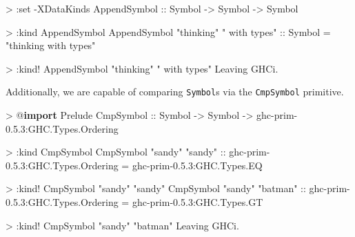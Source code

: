 \documentclass[
  11pt,
]{book}
\newenvironment{Shaded}{}{}
\newcommand{\CharTok}[1]{\textcolor[rgb]{0.25,0.44,0.63}{#1}}
\newcommand{\DataTypeTok}[1]{\textcolor[rgb]{0.56,0.13,0.00}{#1}}
\newcommand{\DecValTok}[1]{\textcolor[rgb]{0.25,0.63,0.44}{#1}}
\newcommand{\FloatTok}[1]{\textcolor[rgb]{0.25,0.63,0.44}{#1}}
\newcommand{\KeywordTok}[1]{\textcolor[rgb]{0.00,0.44,0.13}{\textbf{#1}}}
\newcommand{\NormalTok}[1]{#1}
\newcommand{\OperatorTok}[1]{\textcolor[rgb]{0.40,0.40,0.40}{#1}}
\newcommand{\OtherTok}[1]{\textcolor[rgb]{0.00,0.44,0.13}{#1}}
\newcommand{\StringTok}[1]{\textcolor[rgb]{0.25,0.44,0.63}{#1}}
\theoremstyle{nonumberplain}
\begin{document}
\begin{Shaded}
\begin{Highlighting}[]
\OperatorTok{\textgreater{}} \OperatorTok{:}\NormalTok{set }\OperatorTok{{-}}\DataTypeTok{XDataKinds}
\DataTypeTok{AppendSymbol}\OtherTok{ ::} \DataTypeTok{Symbol} \OtherTok{{-}\textgreater{}} \DataTypeTok{Symbol} \OtherTok{{-}\textgreater{}} \DataTypeTok{Symbol}


\OperatorTok{\textgreater{}} \OperatorTok{:}\NormalTok{kind }\DataTypeTok{AppendSymbol}
\DataTypeTok{AppendSymbol} \StringTok{"thinking"} \StringTok{" with types"}\OtherTok{ ::} \DataTypeTok{Symbol}
\OtherTok{=} \StringTok{"thinking with types"}


\OperatorTok{\textgreater{}} \OperatorTok{:}\NormalTok{kind}\OperatorTok{!} \DataTypeTok{AppendSymbol} \StringTok{"thinking"} \StringTok{" with types"}
\DataTypeTok{Leaving} \DataTypeTok{GHCi}\OperatorTok{.}
\end{Highlighting}
\end{Shaded}

Additionally, we are capable of comparing \texttt{Symbol}s via the
\texttt{CmpSymbol} primitive.

\begin{Shaded}
\begin{Highlighting}[]
\OperatorTok{\textgreater{}} \OperatorTok{@}\KeywordTok{import} \DataTypeTok{Prelude}
\DataTypeTok{CmpSymbol}\OtherTok{ ::} \DataTypeTok{Symbol} \OtherTok{{-}\textgreater{}} \DataTypeTok{Symbol} \OtherTok{{-}\textgreater{}}\NormalTok{ ghc}\OperatorTok{{-}}\NormalTok{prim}\OperatorTok{{-}}\FloatTok{0.5}\OperatorTok{.}\DecValTok{3}\OperatorTok{:}\DataTypeTok{GHC.Types.Ordering}


\OperatorTok{\textgreater{}} \OperatorTok{:}\NormalTok{kind }\DataTypeTok{CmpSymbol}
\DataTypeTok{CmpSymbol} \StringTok{"sandy"} \StringTok{"sandy"}\OtherTok{ ::}\NormalTok{ ghc}\OperatorTok{{-}}\NormalTok{prim}\OperatorTok{{-}}\FloatTok{0.5}\OperatorTok{.}\DecValTok{3}\OperatorTok{:}\DataTypeTok{GHC.Types.Ordering}
\OtherTok{=} \CharTok{\textquotesingle{}ghc{-}prim{-}0.5.3:GHC.Types.EQ}


\OperatorTok{\textgreater{}} \OperatorTok{:}\NormalTok{kind}\OperatorTok{!} \DataTypeTok{CmpSymbol} \StringTok{"sandy"} \StringTok{"sandy"}
\DataTypeTok{CmpSymbol} \StringTok{"sandy"} \StringTok{"batman"}\OtherTok{ ::}\NormalTok{ ghc}\OperatorTok{{-}}\NormalTok{prim}\OperatorTok{{-}}\FloatTok{0.5}\OperatorTok{.}\DecValTok{3}\OperatorTok{:}\DataTypeTok{GHC.Types.Ordering}
\OtherTok{=} \CharTok{\textquotesingle{}ghc{-}prim{-}0.5.3:GHC.Types.GT}


\OperatorTok{\textgreater{}} \OperatorTok{:}\NormalTok{kind}\OperatorTok{!} \DataTypeTok{CmpSymbol} \StringTok{"sandy"} \StringTok{"batman"}
\DataTypeTok{Leaving} \DataTypeTok{GHCi}\OperatorTok{.}
\end{Highlighting}
\end{Shaded}
\end{document}
